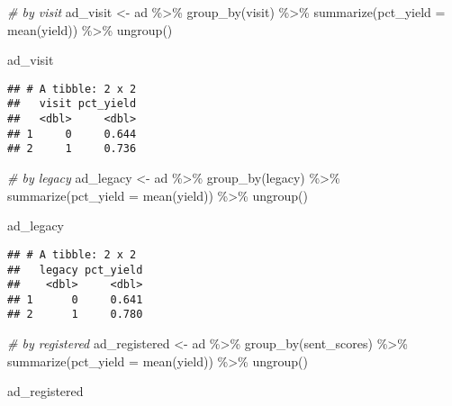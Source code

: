 \documentclass[
]{article}
\newenvironment{Shaded}{\begin{snugshade}}{\end{snugshade}}
\newcommand{\AttributeTok}[1]{\textcolor[rgb]{0.77,0.63,0.00}{#1}}
\newcommand{\CommentTok}[1]{\textcolor[rgb]{0.56,0.35,0.01}{\textit{#1}}}
\newcommand{\FunctionTok}[1]{\textcolor[rgb]{0.00,0.00,0.00}{#1}}
\newcommand{\NormalTok}[1]{#1}
\newcommand{\OtherTok}[1]{\textcolor[rgb]{0.56,0.35,0.01}{#1}}
\newcommand{\SpecialCharTok}[1]{\textcolor[rgb]{0.00,0.00,0.00}{#1}}
\begin{document}
\begin{Shaded}
\begin{Highlighting}[]
\CommentTok{\# by visit}
\NormalTok{ad\_visit }\OtherTok{\textless{}{-}}\NormalTok{ ad }\SpecialCharTok{\%\textgreater{}\%}
  \FunctionTok{group\_by}\NormalTok{(visit) }\SpecialCharTok{\%\textgreater{}\%}
  \FunctionTok{summarize}\NormalTok{(}\AttributeTok{pct\_yield =} \FunctionTok{mean}\NormalTok{(yield)) }\SpecialCharTok{\%\textgreater{}\%}
  \FunctionTok{ungroup}\NormalTok{() }

\NormalTok{ad\_visit}
\end{Highlighting}
\end{Shaded}

\begin{verbatim}
## # A tibble: 2 x 2
##   visit pct_yield
##   <dbl>     <dbl>
## 1     0     0.644
## 2     1     0.736
\end{verbatim}

\begin{Shaded}
\begin{Highlighting}[]
\CommentTok{\# by legacy}
\NormalTok{ad\_legacy }\OtherTok{\textless{}{-}}\NormalTok{ ad }\SpecialCharTok{\%\textgreater{}\%}
  \FunctionTok{group\_by}\NormalTok{(legacy) }\SpecialCharTok{\%\textgreater{}\%}
  \FunctionTok{summarize}\NormalTok{(}\AttributeTok{pct\_yield =} \FunctionTok{mean}\NormalTok{(yield)) }\SpecialCharTok{\%\textgreater{}\%}
  \FunctionTok{ungroup}\NormalTok{()}

\NormalTok{ad\_legacy}
\end{Highlighting}
\end{Shaded}

\begin{verbatim}
## # A tibble: 2 x 2
##   legacy pct_yield
##    <dbl>     <dbl>
## 1      0     0.641
## 2      1     0.780
\end{verbatim}

\begin{Shaded}
\begin{Highlighting}[]
\CommentTok{\# by registered }
\NormalTok{ad\_registered }\OtherTok{\textless{}{-}}\NormalTok{ ad }\SpecialCharTok{\%\textgreater{}\%}
  \FunctionTok{group\_by}\NormalTok{(sent\_scores) }\SpecialCharTok{\%\textgreater{}\%}
  \FunctionTok{summarize}\NormalTok{(}\AttributeTok{pct\_yield =} \FunctionTok{mean}\NormalTok{(yield)) }\SpecialCharTok{\%\textgreater{}\%}
  \FunctionTok{ungroup}\NormalTok{()}

\NormalTok{ad\_registered}
\end{Highlighting}
\end{Shaded}
\end{document}
